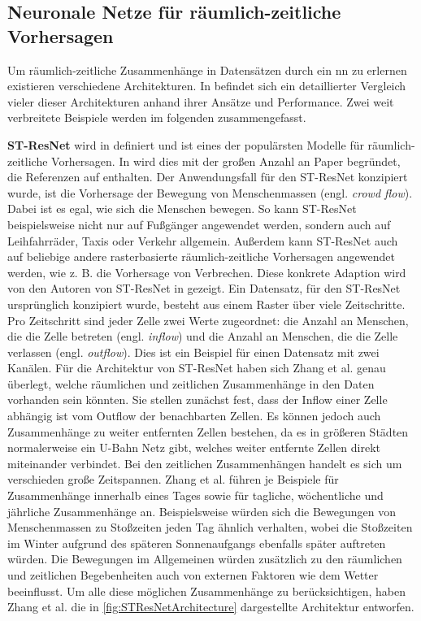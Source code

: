 \subsection{Neuronale Netze für räumlich-zeitliche Vorhersagen}
\label{sec:STNNs}

Um räumlich-zeitliche Zusammenhänge in Datensätzen durch ein \acrshort{nn} zu erlernen existieren verschiedene Architekturen.
In \cite{DLTraff} befindet sich ein detaillierter Vergleich vieler dieser Architekturen anhand ihrer Ansätze und Performance.
Zwei weit verbreitete Beispiele werden im folgenden zusammengefasst.

\textbf{ST-ResNet} wird in \cite{STResNetOriginal} definiert und ist eines der populärsten Modelle für räumlich-zeitliche Vorhersagen.
In \cite{DLTraff} wird dies mit der großen Anzahl an Paper begründet, die Referenzen auf \cite{STResNetOriginal} enthalten.
Der Anwendungsfall für den ST-ResNet konzipiert wurde, ist die Vorhersage der Bewegung von Menschenmassen (engl. \emph{crowd flow}).
Dabei ist es egal, wie sich die Menschen bewegen.
So kann ST-ResNet beispielsweise nicht nur auf Fußgänger angewendet werden, sondern auch auf Leihfahrräder, Taxis oder Verkehr allgemein.
Außerdem kann ST-ResNet auch auf beliebige andere rasterbasierte räumlich-zeitliche Vorhersagen angewendet werden, wie z. B. die Vorhersage von Verbrechen.
Diese konkrete Adaption wird von den Autoren von ST-ResNet in \cite{CrimeSTResNet} gezeigt.
Ein Datensatz, für den ST-ResNet ursprünglich konzipiert wurde, besteht aus einem Raster über viele Zeitschritte.
Pro Zeitschritt sind jeder Zelle zwei Werte zugeordnet: die Anzahl an Menschen, die die Zelle betreten (engl. \emph{inflow}) und die Anzahl an Menschen, die die Zelle verlassen (engl. \emph{outflow}).
Dies ist ein Beispiel für einen Datensatz mit zwei Kanälen.
Für die Architektur von ST-ResNet haben sich Zhang et al. genau überlegt, welche räumlichen und zeitlichen Zusammenhänge in den Daten vorhanden sein könnten.
Sie stellen zunächst fest, dass der Inflow einer Zelle abhängig ist vom Outflow der benachbarten Zellen.
Es können jedoch auch Zusammenhänge zu weiter entfernten Zellen bestehen, da es in größeren Städten normalerweise ein U-Bahn Netz gibt, welches weiter entfernte Zellen direkt miteinander verbindet.
Bei den zeitlichen Zusammenhängen handelt es sich um verschieden große Zeitspannen.
Zhang et al. führen je Beispiele für Zusammenhänge innerhalb eines Tages sowie für tagliche, wöchentliche und jährliche Zusammenhänge an.
Beispielsweise würden sich die Bewegungen von Menschenmassen zu Stoßzeiten jeden Tag ähnlich verhalten, wobei die Stoßzeiten im Winter aufgrund des späteren Sonnenaufgangs ebenfalls später auftreten würden.
Die Bewegungen im Allgemeinen würden zusätzlich zu den räumlichen und zeitlichen Begebenheiten auch von externen Faktoren wie dem Wetter beeinflusst.
Um alle diese möglichen Zusammenhänge zu berücksichtigen, haben Zhang et al. die in \autoref{fig:STResNetArchitecture} dargestellte Architektur entworfen.

